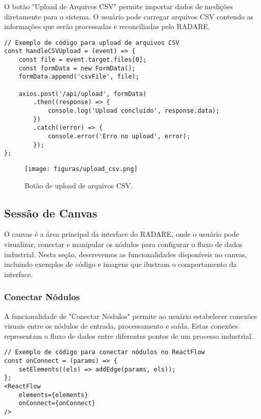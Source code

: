 O botão "Upload de Arquivos CSV" permite importar dados de medições diretamente para o sistema. O usuário pode carregar arquivos CSV contendo as informações que serão processadas e reconciliadas pelo RADARE.

\begin{verbatim}
// Exemplo de código para upload de arquivos CSV
const handleCSVUpload = (event) => {
    const file = event.target.files[0];
    const formData = new FormData();
    formData.append('csvFile', file);

    axios.post('/api/upload', formData)
        .then((response) => {
            console.log('Upload concluído', response.data);
        })
        .catch((error) => {
            console.error('Erro no upload', error);
        });
};
\end{verbatim}

\begin{figure}[htbp]
    \centering
    \texttt{[image: figuras/upload\_csv.png]}
    \caption{Botão de upload de arquivos CSV.}
    \label{Fig:UploadCSV}
\end{figure}


\subsection{Sessão de Canvas}

O canvas é a área principal da interface do RADARE, onde o usuário pode visualizar, conectar e manipular os nódulos para configurar o fluxo de dados industrial. Nesta seção, descrevemos as funcionalidades disponíveis no canvas, incluindo exemplos de código e imagens que ilustram o comportamento da interface.

\subsubsection{Conectar Nódulos}

A funcionalidade de "Conectar Nódulos" permite ao usuário estabelecer conexões visuais entre os nódulos de entrada, processamento e saída. Estas conexões representam o fluxo de dados entre diferentes pontos de um processo industrial.

\begin{verbatim}
// Exemplo de código para conectar nódulos no ReactFlow
const onConnect = (params) => {
    setElements((els) => addEdge(params, els));
};
<ReactFlow
    elements={elements}
    onConnect={onConnect}
/>
\end{verbatim}

